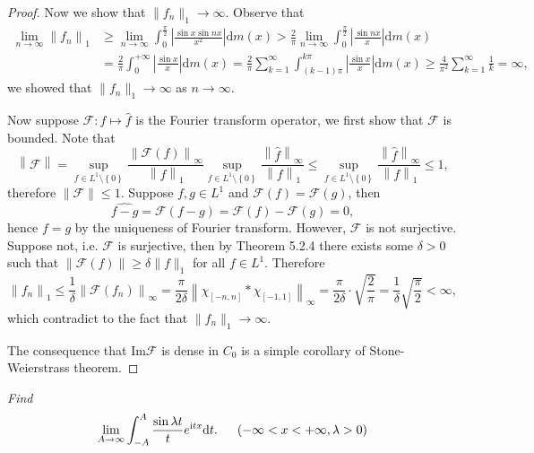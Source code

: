 \begin{proof}
Now we show that $\|f_n\|_1\to\infty$. Observe that 
$$
\begin{aligned}
\lim_{n\rightarrow \infty} \left\| f_n \right\| _1&\ge \lim_{n\rightarrow \infty} \int_0^{\frac{\pi}{2}}{\left| \frac{\sin x\sin nx}{x^2} \right|\mathrm{d}m\left( x \right)}>\frac{2}{\pi}\lim_{n\rightarrow \infty} \int_0^{\frac{\pi}{2}}{\left| \frac{\sin nx}{x} \right|\mathrm{d}m\left( x \right)}
\\
&=\frac{2}{\pi}\int_0^{+\infty}{\left| \frac{\sin x}{x} \right|\mathrm{d}m\left( x \right)}=\frac{2}{\pi}\sum_{k=1}^{\infty}{\int_{\left( k-1 \right) \pi}^{k\pi}{\left| \frac{\sin x}{x} \right|\mathrm{d}m\left( x \right)}}\ge \frac{4}{\pi ^2}\sum_{k=1}^{\infty}{\frac{1}{k}}=\infty ,
\end{aligned}
$$
we showed that $\|f_n\|_1\to\infty$ as $n\to\infty$.\par
Now suppose $\mathscr{F}:f\mapsto\widehat{f}$ is the Fourier transform operator, we first show that $\mathscr{F}$ is bounded. Note that 
$$
\left\| \mathscr{F} \right\| =\mathop {\mathrm{sup}} \limits_{f\in L^1\setminus \left\{ 0 \right\}}\frac{\left\| \mathscr{F} \left( f \right) \right\| _{\infty}}{\left\| f \right\| _1}\mathop {\mathrm{sup}} \limits_{f\in L^1\setminus \left\{ 0 \right\}}\frac{\left\| \widehat{f} \right\| _{\infty}}{\left\| f \right\| _1}\le \mathop {\mathrm{sup}} \limits_{f\in L^1\setminus \left\{ 0 \right\}}\frac{\left\| \widehat{f} \right\| _{\infty}}{\left\| f \right\| _1}\le 1,
$$
therefore $\|\mathscr{F}\|\le 1$. Suppose $f,g\in L^1$ and $\mathscr{F}(f)=\mathscr{F}(g)$, then 
$$
\widehat{f-g}=\mathscr{F} \left( f-g \right) =\mathscr{F} \left( f \right) -\mathscr{F} \left( g \right) =0,
$$
hence $f=g$ by the uniqueness of Fourier transform. However, $\mathscr{F}$ is not surjective. Suppose not, i.e. $\mathscr{F}$ is surjective, then by Theorem 5.2.4 there exists some $\delta>0$ such that $\|\mathscr{F}(f)\|\ge\delta\|f\|_1$ for all $f\in L^1$. Therefore 
$$
\left\| f_n \right\| _1\le \frac{1}{\delta}\left\| \mathscr{F} \left( f_n \right) \right\| _{\infty}=\frac{\pi}{2\delta}\left\| \chi _{\left[ -n,n \right]}*\chi _{\left[ -1,1 \right]} \right\| _{\infty}=\frac{\pi}{2\delta}\cdot \sqrt{\frac{2}{\pi}}=\frac{1}{\delta}\sqrt{\frac{\pi}{2}}<\infty ,
$$
which contradict to the fact that $\|f_n\|_1\to\infty$.\par
The consequence that $\mathrm{Im}\mathscr{F}$ is dense in $C_0$ is a simple corollary of Stone-Weierstrass theorem.
\end{proof}
\begin{problem}\em
Find 
$$
\lim_{A\rightarrow \infty} \int_{-A}^A{\frac{\sin \lambda t}{t}e^{\mathrm{i}tx}\mathrm{d}t}.\hspace{0.5cm}\left( -\infty <x<+\infty ,\lambda >0 \right) 
$$
\end{problem}

